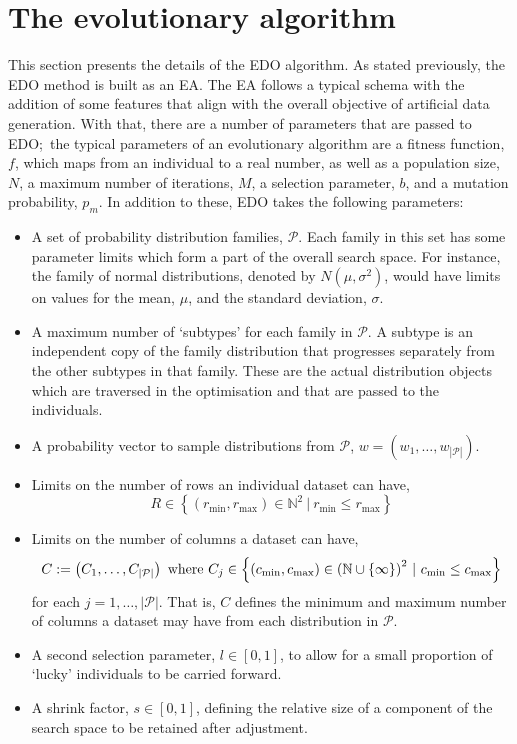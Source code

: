 \section{The evolutionary algorithm}\label{section:algorithm}

This section presents the details of the EDO algorithm. As stated previously,
the EDO method is built as an EA. The EA follows a typical schema with the
addition of some features that align with the overall objective of artificial
data generation. With that, there are a number of parameters that are passed to
EDO;\ the typical parameters of an evolutionary algorithm are a fitness
function, \(f\), which maps from an individual to a real number, as well as a
population size, \(N\), a maximum number of iterations, \(M\), a selection
parameter, \(b\), and a mutation probability, \(p_m\). In addition to these,
EDO takes the following parameters:
\begin{itemize}
    \item A set of probability distribution families, \(\mathcal{P}\). Each
        family in this set has some parameter limits which form a part of the
        overall search space. For instance, the family of normal distributions,
        denoted by \(N(\mu, \sigma^2)\), would have limits on values for the
        mean, \(\mu\), and the standard deviation, \(\sigma\).
    \item A maximum number of `subtypes' for each family in \(\mathcal{P}\). A
        subtype is an independent copy of the family distribution that
        progresses separately from the other subtypes in that family. These are
        the actual distribution objects which are traversed in the optimisation
        and that are passed to the individuals.
    \item A probability vector to sample distributions from \(\mathcal{P}\),
        \(w = \left(w_1, \ldots, w_{|\mathcal{P}|}\right)\).
    \item Limits on the number of rows an individual dataset can have,
        \[
            R \in \left\{%
                (r_{\min}, r_{\max}) \in \mathbb{N}^2~|~r_{\min} \leq r_{\max}
            \right\}
        \]
    \item Limits on the number of columns a dataset can have,
        \[
            C := \left(C_1, \ldots, C_{|\mathcal{P}|}\right)
            \text{ where }
            C_j \in \left\{ (c_{\min}, c_{\max}) \in {%
                \left(\mathbb{N}\cup\{\infty\}\right)
            }^2~|~c_{\min} \leq c_{\max}\right\}
        \]
        for each \(j = 1, \ldots, |\mathcal{P}|\). That is, \(C\) defines the
        minimum and maximum number of columns a dataset may have from each
        distribution in \(\mathcal{P}\).
    \item A second selection parameter, \(l \in [0, 1]\), to allow for a
        small proportion of `lucky' individuals to be carried forward.
    \item A shrink factor, \(s \in [0, 1]\), defining the relative size of a
        component of the search space to be retained after adjustment.
\end{itemize}

